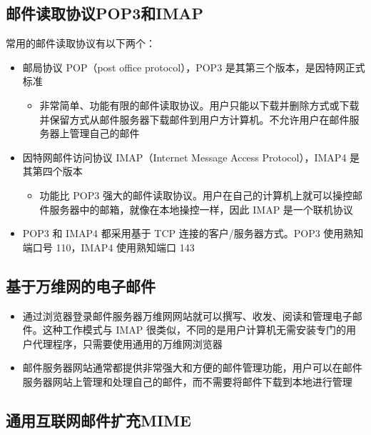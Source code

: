 \documentclass[cs4size,a4paper,10pt]{ctexart}
\begin{document}
	\subsection{邮件读取协议POP3和IMAP}
	常用的邮件读取协议有以下两个：
	\begin{itemize}
		\item 邮局协议 POP（post office protocol），POP3 是其第三个版本，是因特网正式标准
		\begin{itemize}
			\item 非常简单、功能有限的邮件读取协议。用户只能以下载并删除方式或下载并保留方式从邮件服务器下载邮件到用户方计算机。不允许用户在邮件服务器上管理自己的邮件
		\end{itemize}
		\item 因特网邮件访问协议 IMAP（Internet Message Access Protocol），IMAP4 是其第四个版本
		\begin{itemize}
			\item 功能比 POP3 强大的邮件读取协议。用户在自己的计算机上就可以操控邮件服务器中的邮箱，就像在本地操控一样，因此 IMAP 是一个联机协议
		\end{itemize}
		\item POP3 和 IMAP4 都采用基于 TCP 连接的客户/服务器方式。POP3 使用熟知端口号 110，IMAP4 使用熟知端口 143
	\end{itemize}

	\subsection{基于万维网的电子邮件}
	\begin{itemize}
		\item 通过浏览器登录邮件服务器万维网网站就可以撰写、收发、阅读和管理电子邮件。这种工作模式与 IMAP 很类似，不同的是用户计算机无需安装专门的用户代理程序，只需要使用通用的万维网浏览器
		\item 邮件服务器网站通常都提供非常强大和方便的邮件管理功能，用户可以在邮件服务器网站上管理和处理自己的邮件，而不需要将邮件下载到本地进行管理
	\end{itemize}

	\subsection{通用互联网邮件扩充MIME}
\end{document}
